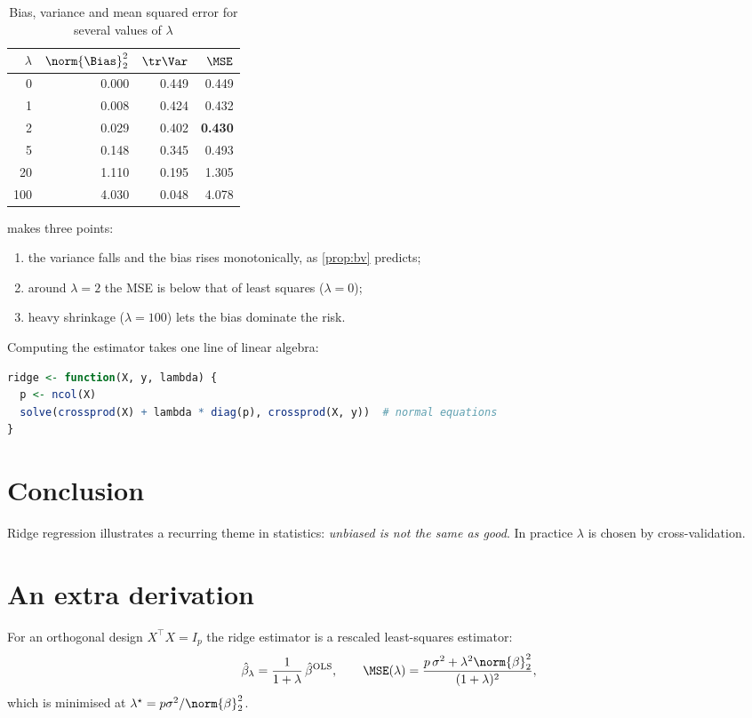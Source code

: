 \documentclass[lang=en]{mainsub-report}
\begin{document}
\begin{table}[htbp]
  \centering
  \caption{Bias, variance and mean squared error for several values of $\lambda$}
  \label{tab:mse}
  \begin{tabular}{@{}rrrr@{}}
    \toprule
    $\lambda$ & $\norm{\Bias}_2^2$ & $\tr\Var$ & $\MSE$ \\
    \midrule
    0   & 0.000 & 0.449 & 0.449 \\
    1   & 0.008 & 0.424 & 0.432 \\
    2   & 0.029 & 0.402 & \textbf{0.430} \\
    5   & 0.148 & 0.345 & 0.493 \\
    20  & 1.110 & 0.195 & 1.305 \\
    100 & 4.030 & 0.048 & 4.078 \\
    \bottomrule
  \end{tabular}
\end{table}

 makes three points:
\begin{enumerate}
  \item the variance falls and the bias rises monotonically, as \cref{prop:bv} predicts;
  \item around $\lambda = 2$ the MSE is below that of least squares ($\lambda=0$);
  \item heavy shrinkage ($\lambda=100$) lets the bias dominate the risk.
\end{enumerate}

Computing the estimator takes one line of linear algebra:
\begin{lstlisting}[language=R]
ridge <- function(X, y, lambda) {
  p <- ncol(X)
  solve(crossprod(X) + lambda * diag(p), crossprod(X, y))  # normal equations
}
\end{lstlisting}

\section{Conclusion}

Ridge regression illustrates a recurring theme in statistics: \emph{unbiased is not the same as good}.
In practice $\lambda$ is chosen by cross-validation.

\printbibliography

\appendix
\section{An extra derivation}\label{app:extra}

For an orthogonal design $X^\top X = I_p$ the ridge estimator is a rescaled least-squares estimator:
\[
  \hat\beta_\lambda = \frac{1}{1+\lambda}\,\hat\beta^{\mathrm{OLS}},
  \qquad
  \MSE(\lambda) = \frac{p\,\sigma^2 + \lambda^2\norm{\beta}_2^2}{(1+\lambda)^2},
\]
which is minimised at $\lambda^\star = p\sigma^2/\norm{\beta}_2^2$.
\end{document}
